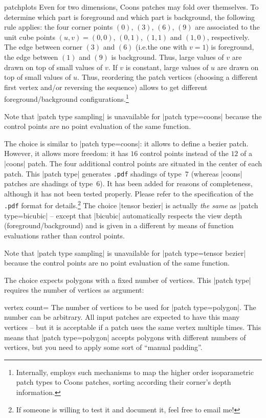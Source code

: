 {\begin{pgfplotslibrary}{patchplots}
Even for two dimensions, Coons patches may fold over themselves. To determine
which part is foreground and which part is background, the following rule
applies: the four corner points $(0)$, $(3)$, $(6)$, $(9)$ are associated to
the unit cube points $(u,v) = (0,0)$, $(0,1)$, $(1,1)$ and $(1,0)$,
respectively. The edge between corner $(3)$ and $(6)$ (i.e.\@ the one with
$v=1$) is foreground, the edge between $(1)$ and $(9)$ is background. Thus,
large values of $v$ are drawn on top of small values of $v$. If $v$ is
constant, large values of $u$ are drawn on top of small values of $u$. Thus,
reordering the patch vertices (choosing a different first vertex and/or
reversing the sequence) allows to get different foreground/background
configurations.\footnote{Internally, \PGFPlots{} employs such mechanisms to map
the higher order isoparametric patch types to Coons patches, sorting according
their corner's depth information.}

Note that |patch type sampling| is unavailable for |patch type=coons| because
the control points are no point evaluation of the same function.

The choice  is similar to |patch type=coons|: it
allows to define a bezier patch. However, it allows more freedom: it has $16$
control points instead of the $12$ of a |coons| patch. The four additional
control points are situated in the center of each patch. This |patch type|
generates \texttt{.pdf} shadings of type~$7$ (whereas |coons| patches are
shadings of type~$6$). It has been added for reasons of completeness, although
it has not been tested properly. Please refer to the specification of the
\texttt{.pdf} format for details.\footnote{If someone is willing to test it and
document it, feel free to email me!} The choice |tensor bezier| is actually
\emph{the same} as |patch type=bicubic| -- except that |bicubic| automatically
respects the view depth (foreground/background) and is given in a different by
means of function evaluations rather than control points.

Note that |patch type sampling| is unavailable for |patch type=tensor bezier|
because the control points are no point evaluation of the same function.

The choice  expects polygons with a fixed number of
vertices. This |patch type| requires the number of vertices as argument:

\begin{pgfplotskey}{vertex count=}
    The number of vertices to be used for |patch type=polygon|. The number can
    be arbitrary. All input patches are expected to have this many vertices --
    but it is acceptable if a patch uses the same vertex multiple times. This
    means that |patch type=polygon| accepts polygons with different numbers of
    vertices, but you need to apply some sort of ``manual padding''.


\end{pgfplotskey}
\end{pgfplotslibrary}}
